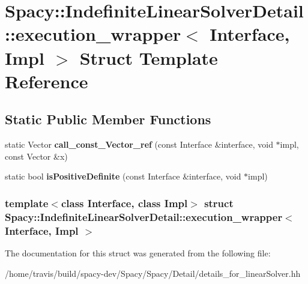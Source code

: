 \hypertarget{structSpacy_1_1IndefiniteLinearSolverDetail_1_1execution__wrapper}{\section{\-Spacy\-:\-:\-Indefinite\-Linear\-Solver\-Detail\-:\-:execution\-\_\-wrapper$<$ \-Interface, \-Impl $>$ \-Struct \-Template \-Reference}
\label{structSpacy_1_1IndefiniteLinearSolverDetail_1_1execution__wrapper}
}
\subsection*{\-Static \-Public \-Member \-Functions}
\begin{DoxyCompactItemize}
\item 
\hypertarget{structSpacy_1_1IndefiniteLinearSolverDetail_1_1execution__wrapper_a6d5619067a8d58999bac5efaed662273}{static \-Vector {\bfseries call\-\_\-const\-\_\-\-Vector\-\_\-ref} (const \-Interface \&interface, void $\ast$impl, const \-Vector \&x)}\label{structSpacy_1_1IndefiniteLinearSolverDetail_1_1execution__wrapper_a6d5619067a8d58999bac5efaed662273}

\item 
\hypertarget{structSpacy_1_1IndefiniteLinearSolverDetail_1_1execution__wrapper_ab98a89e8e211c47e73394b3f59e24c1a}{static bool {\bfseries is\-Positive\-Definite} (const \-Interface \&interface, void $\ast$impl)}\label{structSpacy_1_1IndefiniteLinearSolverDetail_1_1execution__wrapper_ab98a89e8e211c47e73394b3f59e24c1a}

\end{DoxyCompactItemize}
\subsubsection*{template$<$class Interface, class Impl$>$ struct Spacy\-::\-Indefinite\-Linear\-Solver\-Detail\-::execution\-\_\-wrapper$<$ Interface, Impl $>$}



\-The documentation for this struct was generated from the following file\-:\begin{DoxyCompactItemize}
\item 
/home/travis/build/spacy-\/dev/\-Spacy/\-Spacy/\-Detail/details\-\_\-for\-\_\-linear\-Solver.\-hh\end{DoxyCompactItemize}

